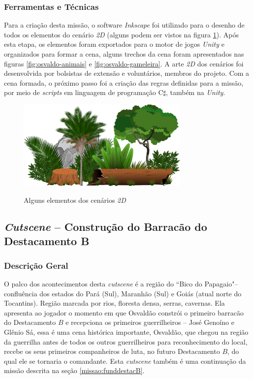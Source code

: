 \subsubsection{Ferramentas e Técnicas}

Para a criação desta missão, o software \textit{Inkscape} foi utilizado para o desenho de todos os elementos do cenário \textit{2D} (alguns podem ser vistos na figura \ref{fig:elementos-2d}). Após esta etapa, os elementos foram exportados para o motor de jogos \textit{Unity} e organizados para formar a cena, alguns trechos da cena foram apresentados nas figuras \ref{fig:osvaldo-animais} e \ref{fig:osvaldo-gameleira}. A arte \textit{2D} dos cenários foi desenvolvida por bolsistas de extensão e voluntários, membros do projeto. Com a cena formada, o próximo passo foi a criação das regras definidas para a missão, por meio de \textit{scripts} em linguagem de programação C$\sharp$, também na \textit{Unity}.

\begin{figure}[H]
	\centering
	\caption{Alguns elementos dos cenários \textit{2D}}
	\includegraphics[width=0.75\textwidth]{figuras/elementos_2d.png}
	\label{fig:elementos-2d}
	{}
\end{figure}

\subsection{\textit{Cutscene} -- Construção do Barracão do Destacamento B}

\subsubsection{Descrição Geral}

O palco dos acontecimentos desta \textit{cutscene} é a região do ``Bico do Papagaio"\space -- confluência dos estados do Pará (Sul), Maranhão (Sul) e Goiás (atual norte do Tocantins). Região marcada por rios, floresta densa, serras, cavernas. Ela apresenta ao jogador o momento em que Osvaldão constrói o primeiro barracão do Destacamento $B$ e recepciona os primeiros guerrilheiros -- José Genoíno e Glênio Sá, essa é uma cena histórica importante, Osvaldão, que chegou  na região da guerrilha antes de todos os outros guerrilheiros para reconhecimento do local, recebe os seus primeiros companheiros de luta, no futuro Destacamento $B$, do qual ele se tornaria o comandante. Esta \textit{cutscene} também é uma continuação da missão descrita na seção \ref{missao:funddestacB}.

